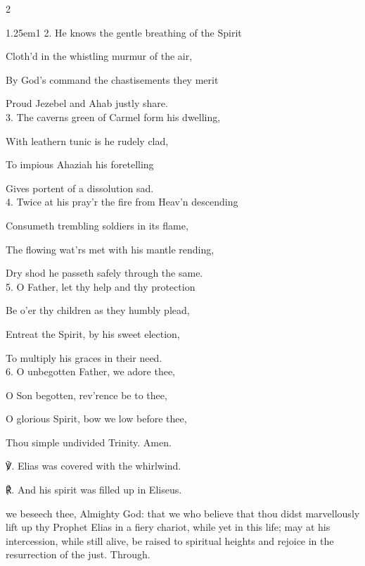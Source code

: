 \begin{paracol}{2}
\begin{hangparas}{1.25em}{1}
2. He knows the gentle breathing of the Spirit

Cloth'd in the whistling murmur of the air,

By God's command the chastisements they merit

Proud Jezebel and Ahab justly share.\\

3. The caverns green of Carmel form his dwelling,

With leathern tunic is he rudely clad,

To impious Ahaziah his foretelling

Gives portent of a dissolution sad.\\

4. Twice at his pray'r the fire from Heav'n descending

Consumeth trembling soldiers in its flame,

The flowing wat'rs met with his mantle rending,

Dry shod he passeth safely through the same.\\

5. O Father, let thy help and thy protection

Be o'er thy children as they humbly plead,

Entreat the Spirit, by his sweet election,

To multiply his graces in their need.\\

6. O unbegotten Father, we adore thee,

O Son begotten, rev'rence be to thee,

O glorious Spirit, bow we low before thee,

Thou simple undivided Trinity. Amen.\\
\end{hangparas}

    ℣. Elias was covered with the whirlwind.

	℟. And his spirit was filled up in Eliseus.

\par\noindent

\fussy	
\end{paracol}


\collect
{} we beseech thee, Almighty God: that we who believe that thou didst marvellously lift up thy Prophet Elias in a fiery chariot, while yet in this life; may at his intercession, while still alive, be raised to spiritual heights and rejoice in the resurrection of the just. Through.


